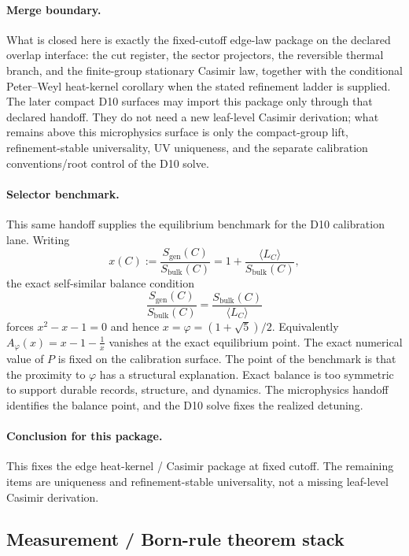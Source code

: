 \documentclass[11pt]{article}
\begin{document}
\paragraph{Merge boundary.}
What is closed here is exactly the fixed-cutoff edge-law package on the declared overlap
interface: the cut register, the sector projectors, the reversible thermal branch, and the
finite-group stationary Casimir law, together with the conditional Peter--Weyl heat-kernel
corollary when the stated refinement ladder is supplied. The later compact D10 surfaces may
import this package only through that declared handoff. They do not need a new leaf-level
Casimir derivation; what remains above this microphysics surface is only the compact-group lift,
refinement-stable universality, UV uniqueness, and the separate calibration conventions/root
control of the D10 solve.

\paragraph{Selector benchmark.}
This same handoff supplies the equilibrium benchmark for the D10 calibration lane. Writing
\[
x(C):=\frac{S_{\mathrm{gen}}(C)}{S_{\mathrm{bulk}}(C)}
=
1+\frac{\langle L_C\rangle}{S_{\mathrm{bulk}}(C)},
\]
the exact self-similar balance condition
\[
\frac{S_{\mathrm{gen}}(C)}{S_{\mathrm{bulk}}(C)}
=
\frac{S_{\mathrm{bulk}}(C)}{\langle L_C\rangle}
\]
forces \(x^2-x-1=0\) and hence \(x=\varphi=(1+\sqrt5)/2\). Equivalently
\(A_\varphi(x)=x-1-\frac1x\) vanishes at the exact equilibrium point. The exact numerical value of
\(P\) is fixed on the calibration surface. The point of the benchmark is that the proximity to
\(\varphi\) has a structural explanation. Exact balance is too symmetric to support durable
records, structure, and dynamics. The microphysics handoff identifies the balance point, and the
D10 solve fixes the realized detuning.

\paragraph{Conclusion for this package.}
This fixes the edge heat-kernel / Casimir package at fixed cutoff. The remaining items are uniqueness and refinement-stable universality, not a missing leaf-level Casimir derivation.

\subsection{Measurement / Born-rule theorem stack}
\end{document}
